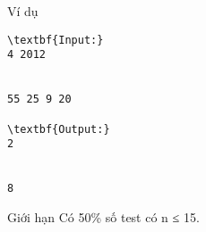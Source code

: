 Ví dụ
\begin{verbatim}
\textbf{Input:}
4 2012


55 25 9 20

\textbf{Output:}
2


8\end{verbatim}
Giới hạn
Có 50\% số test có n ≤ 15.
